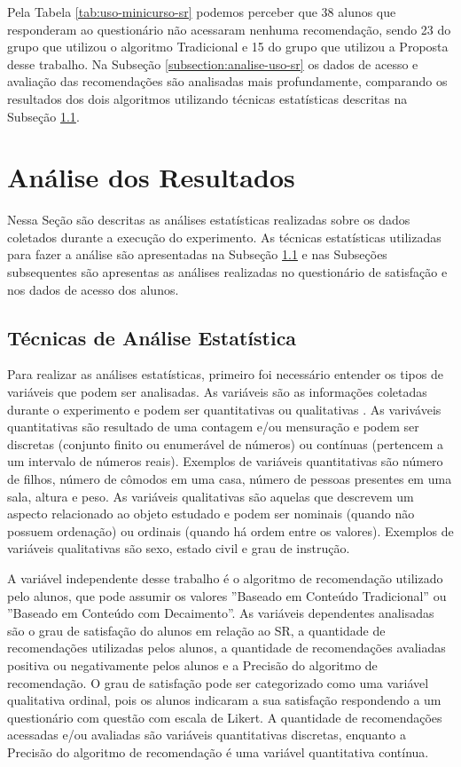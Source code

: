 Pela Tabela \ref{tab:uso-minicurso-sr} podemos perceber que 38 alunos que responderam ao questionário não acessaram nenhuma
recomendação, sendo 23 do grupo que utilizou o algoritmo Tradicional e 15 do grupo que utilizou a Proposta desse
trabalho. Na Subseção \ref{subsection:analise-uso-sr} os dados de acesso e avaliação das recomendações são analisadas mais profundamente,
comparando os resultados dos dois algoritmos utilizando técnicas estatísticas descritas na Subseção \ref{subsection:tecnicas-analise-estatistica}.

\section{Análise dos Resultados}\label{section:analise-experimento}

Nessa Seção são descritas as análises estatísticas realizadas sobre os dados coletados durante a execução do experimento.
As técnicas estatísticas utilizadas para fazer a análise são apresentadas na Subseção \ref{subsection:tecnicas-analise-estatistica}
e nas Subseções subsequentes são apresentas as análises realizadas no questionário de satisfação e nos dados de acesso
dos alunos.

\subsection{Técnicas de Análise Estatística}\label{subsection:tecnicas-analise-estatistica}

Para realizar as análises estatísticas, primeiro foi necessário entender os tipos de variáveis que podem ser analisadas.
As variáveis são as informações coletadas durante o experimento e podem ser quantitativas ou qualitativas \cite{bussab2012morettin}.
As variváveis quantitativas são resultado de uma contagem e/ou mensuração \cite{bussab2012morettin} e podem ser discretas
(conjunto finito ou enumerável de números) ou contínuas (pertencem a um intervalo de números reais). Exemplos de variáveis
quantitativas são número de filhos, número de cômodos em uma casa, número de pessoas presentes em uma sala, altura e peso.
As variáveis qualitativas são aquelas que descrevem um aspecto relacionado ao objeto estudado \cite{bussab2012morettin} e podem ser
nominais (quando não possuem ordenação) ou ordinais (quando há ordem entre os valores). Exemplos de variáveis qualitativas
são sexo, estado civil e grau de instrução.

A variável independente desse trabalho é o algoritmo de recomendação utilizado pelo alunos, que pode assumir os valores
''Baseado em Conteúdo Tradicional'' ou ''Baseado em Conteúdo com Decaimento''. As variáveis dependentes analisadas são o grau de
satisfação do alunos em relação ao SR, a quantidade de recomendações utilizadas pelos alunos, a quantidade de recomendações
avaliadas positiva ou negativamente pelos alunos e a Precisão do algoritmo de recomendação. O grau de satisfação pode ser
categorizado como uma variável qualitativa ordinal, pois os alunos indicaram a sua satisfação respondendo a um questionário
com questão com escala de Likert. A quantidade de recomendações acessadas e/ou avaliadas são variáveis quantitativas discretas,
enquanto a Precisão do algoritmo de recomendação é uma variável quantitativa contínua.

